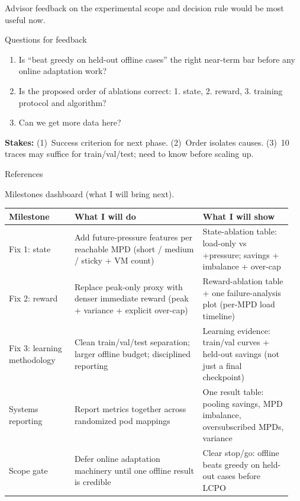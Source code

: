 \documentclass[11pt,aspectratio=43]{beamer}
\begin{document}
\begin{frame}{Advisor feedback on the experimental scope and decision rule would be most useful now.}
  \begin{block}{Questions for feedback}
    \begin{enumerate}
      \item Is ``beat greedy on held-out offline cases'' the right near-term bar before any online adaptation work?
      \item Is the proposed order of ablations correct: 1. state, 2. reward, 3. training protocol and algorithm?
      \item Can we get more data here?
    \end{enumerate}
    \vspace{0.2em}
    \scriptsize
    \textbf{Stakes:} (1)~Success criterion for next phase. (2)~Order isolates causes. (3)~10 traces may suffice for train/val/test; need to know before scaling up.
  \end{block}

  \vspace{0.4em}
  \end{frame}

\begin{frame}[allowframebreaks]{References}
  
  
\end{frame}

\begin{frame}{Milestones dashboard (what I will bring next).}
  \scriptsize
  \begin{tabular}{p{0.22\linewidth}p{0.43\linewidth}p{0.30\linewidth}}
    \toprule
    \textbf{Milestone} & \textbf{What I will do} & \textbf{What I will show} \\
    \midrule
    Fix 1: state &
    Add future-pressure features per reachable MPD (short / medium / sticky + VM count) &
    State-ablation table: load-only vs +pressure; savings + imbalance + over-cap \\
    Fix 2: reward &
    Replace peak-only proxy with denser immediate reward (peak + variance + explicit over-cap) &
    Reward-ablation table + one failure-analysis plot (per-MPD load timeline) \\
    Fix 3: learning methodology &
    Clean train/val/test separation; larger offline budget; disciplined reporting &
    Learning evidence: train/val curves + held-out savings (not just a final checkpoint) \\
    Systems reporting &
    Report metrics together across randomized pod mappings &
    One result table: pooling savings, MPD imbalance, oversubscribed MPDs, variance \\
    Scope gate &
    Defer online adaptation machinery until one offline result is credible &
    Clear stop/go: offline beats greedy on held-out cases before LCPO \\
    \bottomrule
  \end{tabular}
\end{frame}
\end{document}
